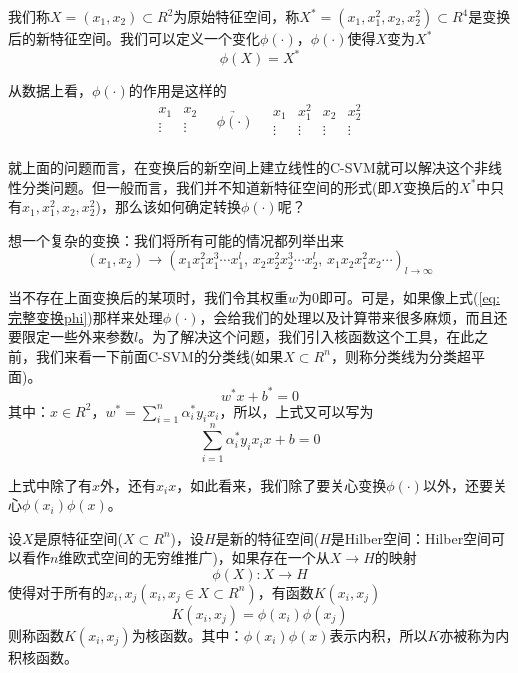 	\par
	我们称$X=(x_1,x_2)\subset R^2$为原始特征空间，称$X^*=(x_1,x_1^2,x_2,x_2^2)\subset R^4$是变换后的新特征空间。我们可以定义一个变化$\phi(\cdot)$，$\phi(\cdot)$使得$X$变为$X^*$
	\[
	\phi(X)=X^*
	\]
	\par
	从数据上看，$\phi(\cdot)$的作用是这样的
	\begin{equation*}
	\begin{matrix}
	x_1 & x_2 \\
	\vdots & \vdots \\
	\end{matrix}
	\quad \underrightarrow{\phi(\cdot)} \quad
	\begin{matrix}
	x_1 & x_1^2 & x_2 & x_2^2 \\
	\vdots & \vdots & \vdots & \vdots \\
	\end{matrix}
	\end{equation*}
	\par
	就上面的问题而言，在变换后的新空间上建立线性的C-SVM就可以解决这个非线性分类问题。但一般而言，我们并不知道新特征空间的形式(即$X$变换后的$X^*$中只有$x_1,x_1^2,x_2,x_2^2$)，那么该如何确定转换$\phi(\cdot)$呢？
	\par
	想一个复杂的变换：我们将所有可能的情况都列举出来
	\begin{equation}
	(x_1, x_2) \longrightarrow (x_1 x_1^2 x_1^3 \cdots x_1^l, \, x_2 x_2^2 x_2^3 \cdots x_2^l, \, x_1 x_2 x_1^2 x_2 \cdots)_{l \rightarrow \infty}
	\label{eq:完整变换phi}
	\end{equation}
	\par
	当不存在上面变换后的某项时，我们令其权重$w$为0即可。可是，如果像上式(\ref{eq:完整变换phi})那样来处理$\phi(\cdot)$，会给我们的处理以及计算带来很多麻烦，而且还要限定一些外来参数$l$。为了解决这个问题，我们引入核函数这个工具，在此之前，我们来看一下前面C-SVM的分类线(如果$X\subset R^n$，则称分类线为分类超平面)。
	\[
	w^*x+b^*=0
	\]
	其中：$x\in R^2$，$w^*=\sum_{i=1}^n\alpha_i^*y_ix_i$，所以，上式又可以写为
	\[
	\sum_{i=1}^n\alpha_i^*y_ix_ix+b=0
	\]
	\par
	上式中除了有$x$外，还有$x_ix$，如此看来，我们除了要关心变换$\phi(\cdot)$以外，还要关心$\phi(x_i)\phi(x)$。
	\begin{definition}[核函数]
	设$X$是原特征空间($X\subset R^n$)，设$H$是新的特征空间($H$是Hilber空间：Hilber空间可以看作$n$维欧式空间的无穷维推广)，如果存在一个从$X\rightarrow H$的映射
	\[
	\phi(X):X\rightarrow H
	\]
	使得对于所有的$x_i,x_j(x_i,x_j\in X\subset R^n)$，有函数$K(x_i,x_j)$
	\[
	K(x_i,x_j)=\phi(x_i)\phi(x_j)
	\]
	则称函数$K(x_i,x_j)$为核函数。其中：$\phi(x_i)\phi(x)$表示内积，所以$K$亦被称为内积核函数。
	\end{definition}
